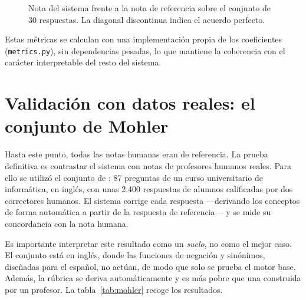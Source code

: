 \begin{figure}[ht]
\centering
{}
\caption{Nota del sistema frente a la nota de referencia sobre el conjunto de 30 respuestas. La diagonal discontinua indica el acuerdo perfecto.}
\label{fig:scatter}
\end{figure}

Estas métricas se calculan con una implementación propia de los coeficientes (\texttt{metrics.py}), sin dependencias pesadas, lo que mantiene la coherencia con el carácter interpretable del resto del sistema.

\section{Validación con datos reales: el conjunto de Mohler}

Hasta este punto, todas las notas humanas eran de referencia. La prueba definitiva es contrastar el sistema con notas de profesores humanos reales. Para ello se utilizó el conjunto de \textcite{mohler2011}: 87 preguntas de un curso universitario de informática, en inglés, con unas 2.400 respuestas de alumnos calificadas por dos correctores humanos. El sistema corrige cada respuesta —derivando los conceptos de forma automática a partir de la respuesta de referencia— y se mide su concordancia con la nota humana.

Es importante interpretar este resultado como un \emph{suelo}, no como el mejor caso. El conjunto está en inglés, donde las funciones de negación y sinónimos, diseñadas para el español, no actúan, de modo que solo se prueba el motor base. Además, la rúbrica se deriva automáticamente y es más pobre que una construida por un profesor. La tabla~\ref{tab:mohler} recoge los resultados.

